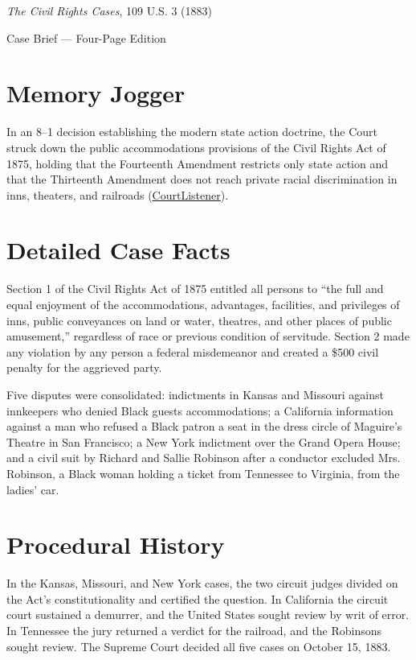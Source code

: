 \documentclass[12pt]{article}
\begin{document}
\begin{center}
{\LARGE \textit{The Civil Rights Cases}, 109 U.S. 3 (1883)\par}
\vspace{0.8em}
{\large Case Brief --- Four-Page Edition\par}
\end{center}
\vspace{1em}

\section{Memory Jogger}

In an 8--1 decision establishing the modern state action doctrine, the Court struck down the public accommodations provisions of the Civil Rights Act of 1875, holding that the Fourteenth Amendment restricts only state action and that the Thirteenth Amendment does not reach private racial discrimination in inns, theaters, and railroads (\href{https://www.courtlistener.com/opinion/90897/civil-rights-cases/}{CourtListener}).

\section{Detailed Case Facts}

Section 1 of the Civil Rights Act of 1875 entitled all persons to ``the full and equal enjoyment of the accommodations, advantages, facilities, and privileges of inns, public conveyances on land or water, theatres, and other places of public amusement,'' regardless of race or previous condition of servitude. Section 2 made any violation by any person a federal misdemeanor and created a \$500 civil penalty for the aggrieved party.

Five disputes were consolidated: indictments in Kansas and Missouri against innkeepers who denied Black guests accommodations; a California information against a man who refused a Black patron a seat in the dress circle of Maguire's Theatre in San Francisco; a New York indictment over the Grand Opera House; and a civil suit by Richard and Sallie Robinson after a conductor excluded Mrs. Robinson, a Black woman holding a ticket from Tennessee to Virginia, from the ladies' car.

\section{Procedural History}

In the Kansas, Missouri, and New York cases, the two circuit judges divided on the Act's constitutionality and certified the question. In California the circuit court sustained a demurrer, and the United States sought review by writ of error. In Tennessee the jury returned a verdict for the railroad, and the Robinsons sought review. The Supreme Court decided all five cases on October 15, 1883.
\end{document}
